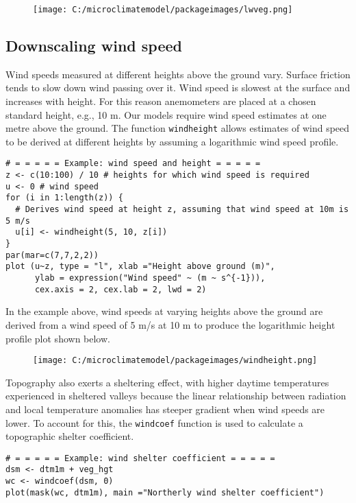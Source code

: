 \documentclass[]{article}
\begin{document}
\begin{figure}
\centering
\texttt{[image: C:/microclimatemodel/packageimages/lwveg.png]}
\caption{}
\end{figure}

\subsection{Downscaling wind speed}\label{downscaling-wind-speed}

Wind speeds measured at different heights above the ground vary. Surface
friction tends to slow down wind passing over it. Wind speed is slowest
at the surface and increases with height. For this reason anemometers
are placed at a chosen standard height, e.g., 10 m. Our models require
wind speed estimates at one metre above the ground. The function
\texttt{windheight} allows estimates of wind speed to be derived at
different heights by assuming a logarithmic wind speed profile.

\begin{verbatim}
# = = = = = Example: wind speed and height = = = = =  
z <- c(10:100) / 10 # heights for which wind speed is required 
u <- 0 # wind speed
for (i in 1:length(z)) { 
  # Derives wind speed at height z, assuming that wind speed at 10m is 5 m/s 
  u[i] <- windheight(5, 10, z[i]) 
}
par(mar=c(7,7,2,2))
plot (u~z, type = "l", xlab ="Height above ground (m)",
      ylab = expression("Wind speed" ~ (m ~ s^{-1})),
      cex.axis = 2, cex.lab = 2, lwd = 2)
\end{verbatim}

In the example above, wind speeds at varying heights above the ground
are derived from a wind speed of 5 m/s at 10 m to produce the
logarithmic height profile plot shown below.

\begin{figure}
\centering
\texttt{[image: C:/microclimatemodel/packageimages/windheight.png]}
\caption{}
\end{figure}

Topography also exerts a sheltering effect, with higher daytime
temperatures experienced in sheltered valleys because the linear
relationship between radiation and local temperature anomalies has
steeper gradient when wind speeds are lower. To account for this, the
\texttt{windcoef} function is used to calculate a topographic shelter
coefficient.

\begin{verbatim}
# = = = = = Example: wind shelter coefficient = = = = =  
dsm <- dtm1m + veg_hgt
wc <- windcoef(dsm, 0)
plot(mask(wc, dtm1m), main ="Northerly wind shelter coefficient")
\end{verbatim}
\end{document}
